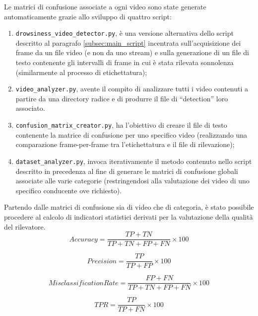 \documentclass[12pt]{article}
\newcommand{\quotes}[1]{``#1''}
\begin{document}
Le matrici di confusione associate a ogni video sono state generate automaticamente grazie allo sviluppo di quattro script:
\begin{enumerate}
	\item \texttt{drowsiness\_video\_detector.py}, è una versione alternativa dello script descritto al paragrafo \ref{subsec:main_script} incentrata sull'acquisizione dei frame da un file video (e non da uno stream) e sulla generazione di un file di testo contenente gli intervalli di frame in cui è stata rilevata sonnolenza (similarmente al processo di etichettatura);
	\item \texttt{video\_analyzer.py}, avente il compito di analizzare tutti i video contenuti a partire da una directory radice e di produrre il file di \quotes{detection} loro associato.
	\item \texttt{confusion\_matrix\_creator.py}, ha l'obiettivo di creare il file di testo contenente la matrice di confusione per uno specifico video (realizzando una comparazione frame-per-frame tra l'etichettatura e il file di rilevazione);
	\item \texttt{dataset\_analyzer.py}, invoca iterativamente il metodo contenuto nello script descritto in precedenza al fine di generare le matrici di confusione globali associate alle varie categorie (restringendosi alla valutazione dei video di uno specifico conducente ove richiesto).
\end{enumerate}

Partendo dalle matrici di confusione sia di video che di categoria, è stato possibile procedere al calcolo di indicatori statistici derivati per la valutazione della qualità del rilevatore.\\

\begin{equation}
Accuracy = \frac{TP + TN}{TP + TN + FP + FN} \times 100
\end{equation}

\begin{equation}
Precision = \frac{TP}{TP + FP} \times 100
\end{equation}

\begin{equation}
MisclassificationRate = \frac{FP + FN}{TP + TN + FP + FN} \times 100
\end{equation}

\begin{equation}
TPR = \frac{TP}{TP + FN} \times 100
\end{equation}
\end{document}
